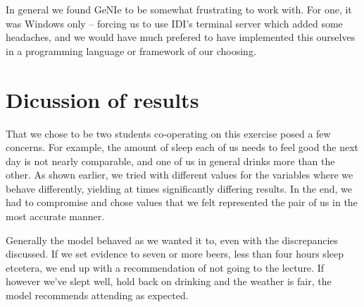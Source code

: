 \documentclass{article}
\begin{document}
In general we found GeNIe to be somewhat frustrating to work with. For one, it
was Windows only -- forcing us to use IDI's terminal server which added some
headaches, and we would have much prefered to have implemented this ourselves
in a programming language or framework of our choosing.

\section*{Dicussion of results}

That we chose to be two students co-operating on this exercise posed a few
concerns. For example, the amount of sleep each of us needs to feel good the
next day is not nearly comparable, and one of us in general drinks more than
the other. As shown earlier, we tried with different values for the variables
where we behave differently, yielding at times significantly differing results.
In the end, we had to compromise and chose values that we felt represented the
pair of us in the most accurate manner.

Generally the model behaved as we wanted it to, even with the discrepancies
discussed. If we set evidence to seven or more beers, less than four hours
sleep etcetera, we end up with a recommendation of not going to the lecture. If
however we've slept well, hold back on drinking and the weather is fair, the
model recommends attending as expected. 
\end{document}
